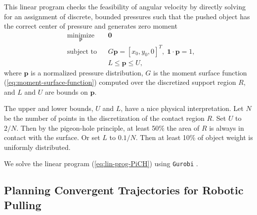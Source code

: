 \documentclass[conference]{IEEEtran}
\newcommand{\EH}[1]{{\color{blue} {Eric: {#1}}  }}
\begin{document}
This linear program checks the feasibility of angular velocity by
directly solving for an assignment of discrete, bounded pressures such
that the pushed object has the correct center of pressure and
generates zero moment
\begin{equation}
  \begin{aligned}
    & \underset{\mathbf{p}}{\text{minimize}}
    & & \mathbf{0} \\
    & \text{subject to}
    & & G\mathbf{p} = [x_0,y_0,0]^T,\; \mathbf{1}\cdot\mathbf{p} = 1, \\
    & & & L \leq \mathbf{p} \leq U,
  \end{aligned} \label{eq:lin-prog-PiCH}
\end{equation}
where $\mathbf{p}$ is a normalized pressure distribution, $G$ is the
moment surface function (\ref{eq:moment-surface-function}) computed
over the discretized support region $R$, and $L$ and $U$ are bounds on
$\mathbf{p}$. 

The upper and lower bounds, $U$ and $L$, have a nice physical
interpretation. Let $N$ be the number of points in the discretization
of the contact region $R$. Set $U$ to $2/N$. Then by the pigeon-hole
principle, at least 50\% the area of $R$ is always in contact with the
surface.  Or set $L$ to $0.1/N$. Then at least 10\% of object weight
is uniformly distributed.

We solve the linear program (\ref{eq:lin-prog-PiCH}) using
\texttt{Gurobi} \cite{gurobi}.

\subsection{Planning Convergent Trajectories for Robotic
  Pulling}\label{sec:diff-dynam-progr}
\end{document}
